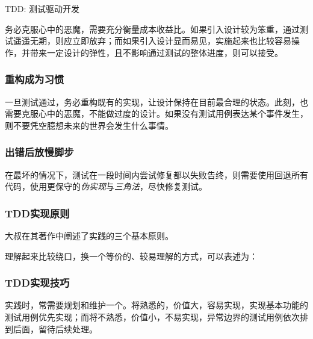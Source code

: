 \begin{content}
\begin{episode}{TDD: 测试驱动开发}
\begin{content}
务必克服心中的恶魔，需要充分衡量成本收益比。如果引入设计较为笨重，通过测试遥遥无期，则应立即放弃；而如果引入设计显而易见，实施起来也比较容易操作，并带来一定设计的弹性，且不影响通过测试的整体进度，则可以接受。

\subsubsection{重构成为习惯}

一旦测试通过，务必重构既有的实现，让设计保持在目前最合理的状态。此刻，也需要克服心中的恶魔，不能做过度的设计。如果没有测试用例表达某个事件发生，则不要凭空臆想未来的世界会发生什么事情。

\subsubsection{出错后放慢脚步}

在最坏的情况下，测试在一段时间内尝试修复都以失败告终，则需要使用回退所有代码，使用更保守的\emph{伪实现}与\emph{三角法}，尽快修复测试。

\subsubsection{TDD实现原则}

大叔在其著作中阐述了实践的三个基本原则。

\begin{enum}
\end{enum}

理解起来比较绕口，换一个等价的、较易理解的方式，可以表述为：

\begin{enum}
\end{enum}

\subsubsection{TDD实现技巧}

实践时，常需要规划和维护一个。将熟悉的，价值大，容易实现，实现基本功能的测试用例优先实现；而将不熟悉，价值小，不易实现，异常边界的测试用例依次排到后面，留待后续处理。

\begin{enum}
\end{enum}


\end{content}
\end{episode}
\end{content}
